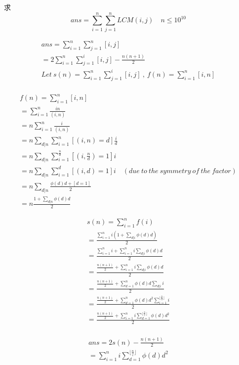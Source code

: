 \vbox{}


\begin{example}
求
$$
ans=\sum_{i=1}^n\sum_{j=1}^n LCM(i,j)    \quad  n \le 10^{10}
$$
\end{example}
\begin{solution}

\begin{align*}
ans=\sum_{i=1}^n\sum_{j=1}^n [i,j]\\
=2\sum_{i=1}^n\sum_{j=1}^i [i,j]-\frac{n(n+1)}2\\
Let\ s(n)=\sum_{i=1}^n\sum_{j=1}^i [i,j]\ ,\ f(n)=\sum_{i=1}^n [i,n]\\
\end{align*}

{\color{red}
\begin{align*}
f(n)=\sum_{i=1}^n [i,n]\\
=\sum_{i=1}^n\frac{in}{(i,n)}\\
=n\sum_{i=1}^n\frac i{(i,n)}\\
=n\sum_{d|n}\sum_{i=1}^n[(i,n)=d]\frac i d\\
=n\sum_{d|n}\sum_{i=1}^{\frac n d}[(i,\frac n d)=1]i\\
=n\sum_{d|n}\sum_{i=1}^{d}[(i,d)=1]i\quad (due\ to\ the\ symmetry\ of\ the\ factor)\\
=n\sum_{d|n}\frac{\phi(d)d+[d=1]}2\\
=n\frac{1+\sum_{d|n}\phi(d)d}2
\end{align*}
}

{\color{blue}
\begin{align*}
s(n)=\sum_{i=1}^n f(i)\\
=\frac{\sum_{i=1}^n i(1+\sum_{d|i}\phi(d)d)}2\\
=\frac{\sum_{i=1}^n i+\sum_{i=1}^n i\sum_{d|i}\phi(d)d}2\\
=\frac{\frac{n(n+1)}2+\sum_{i=1}^n i\sum_{d|i}\phi(d)d}2\\
=\frac{\frac{n(n+1)}2+\sum_{d=1}^n\phi(d)d\sum_{d|i}i}2\\
=\frac{\frac{n(n+1)}2+\sum_{d=1}^n\phi(d)d^2\sum_{i=1}^{\lfloor\frac n d\rfloor}i}2\\
=\frac{\frac{n(n+1)}2+\sum_{i=1}^n i\sum_{d=1}^{\lfloor\frac n i\rfloor}\phi(d)d^2}2\\
\end{align*}
}

{\color{green}
\begin{align*}
ans=2s(n)-\frac{n(n+1)}2\\
=\sum_{i=1}^n i\sum_{d=1}^{\lfloor\frac n i\rfloor}\phi(d)d^2\\
\end{align*}
}


\end{solution}
